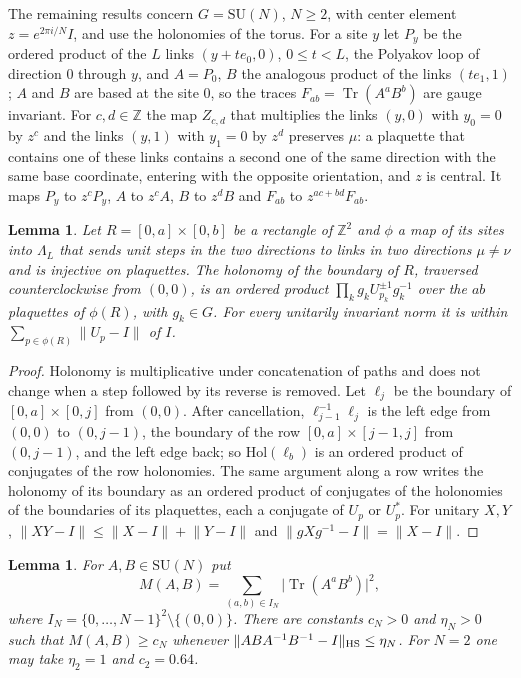 \documentclass[aps,prd,twocolumn,superscriptaddress,nofootinbib,longbibliography,floatfix,amsmath,amssymb,10pt]{revtex4-2}
\newtheorem{lemma}[theorem]{Lemma}
\theoremstyle{definition}
\theoremstyle{remark}
\newcommand{\Z}{\mathbb{Z}}
\newcommand{\SU}{\mathrm{SU}}
\newcommand{\Tr}{\operatorname{Tr}}
\begin{document}
The remaining results concern $G=\SU(N)$, $N\ge2$, with center element
$z=e^{2\pi i/N}I$, and use the holonomies of the torus. For a site $y$ let
$P_y$ be the ordered product of the $L$ links $(y+te_0,0)$, $0\le t<L$, the
Polyakov loop of direction $0$ through $y$, and $A=P_0$, $B$ the analogous
product of the links $(te_1,1)$; $A$ and $B$ are based at the site $0$, so
the traces $F_{ab}=\Tr(A^aB^b)$ are gauge invariant. For $c,d\in\Z$ the
map $Z_{c,d}$ that multiplies the links $(y,0)$ with $y_0=0$ by $z^c$ and the
links $(y,1)$ with $y_1=0$ by $z^d$ preserves $\mu$: a plaquette that contains
one of these links contains a second one of the same direction with the
same base coordinate, entering with the opposite orientation, and $z$ is
central. It maps $P_y$ to $z^cP_y$, $A$ to $z^cA$, $B$ to $z^dB$ and
$F_{ab}$ to $z^{ac+bd}F_{ab}$.

\begin{lemma}\label{lem:bpstokes}
Let $R=[0,a]\times[0,b]$ be a rectangle of $\Z^2$ and $\phi$ a map of its
sites into $\Lambda_L$ that sends unit steps in the two directions to links
in two directions $\mu\ne\nu$ and is injective on plaquettes. The holonomy of
the boundary of $R$, traversed counterclockwise from $(0,0)$, is an ordered
product $\prod_kg_kU_{p_k}^{\pm1}g_k^{-1}$ over the $ab$ plaquettes of
$\phi(R)$, with $g_k\in G$. For every unitarily invariant norm it is within
$\sum_{p\in\phi(R)}\lVert U_p-I\rVert$ of $I$.
\end{lemma}

\begin{proof}
Holonomy is multiplicative under concatenation of paths and does not change
when a step followed by its reverse is removed. Let $\ell_j$ be the
boundary of $[0,a]\times[0,j]$ from $(0,0)$. After cancellation,
$\ell_{j-1}^{-1}\ell_j$ is the left edge from $(0,0)$ to $(0,j-1)$, the
boundary of the row $[0,a]\times[j-1,j]$ from $(0,j-1)$, and the left edge
back; so $\mathrm{Hol}(\ell_b)$ is an ordered product of conjugates of the
row holonomies. The same argument along a row writes the holonomy of its
boundary as an ordered product of conjugates of the holonomies of the
boundaries of its plaquettes, each a conjugate of $U_p$ or $U_p^*$. For
unitary $X,Y$, $\lVert XY-I\rVert\le\lVert X-I\rVert+\lVert Y-I\rVert$ and
$\lVert gXg^{-1}-I\rVert=\lVert X-I\rVert$.
\end{proof}

\begin{lemma}\label{lem:bpcommute}
For $A,B\in\SU(N)$ put
\[
M(A,B)=\sum_{(a,b)\in I_N}\lvert\Tr(A^aB^b)\rvert^2,
\]
where $I_N=\{0,\dots,N-1\}^2\setminus\{(0,0)\}$. There are constants $c_N>0$
and $\eta_N>0$ such that $M(A,B)\ge c_N$ whenever $\lVert ABA^{-1}B^{-1}-I
\rVert_{\rm HS}\le\eta_N$. For $N=2$ one may take $\eta_2=1$ and
$c_2=0.64$.
\end{lemma}
\end{document}
